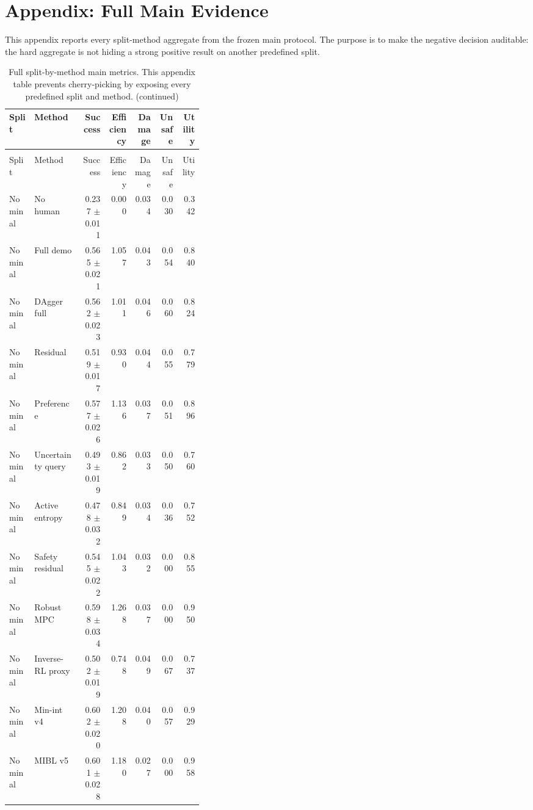 \documentclass{article}
\begin{document}
\section{Appendix: Full Main Evidence}
This appendix reports every split-method aggregate from the frozen main protocol. The purpose is to make the negative decision auditable: the hard aggregate is not hiding a strong positive result on another predefined split.
\begin{center}
\tiny
\begin{longtable}{p{0.13\linewidth}p{0.24\linewidth}rrrrr}
\caption{Full split-by-method main metrics. This appendix table prevents cherry-picking by exposing every predefined split and method.}\label{tab:full-main}\\
\toprule
Split & Method & Success & Efficiency & Damage & Unsafe & Utility\\
\midrule
\endfirsthead
\caption[]{Full split-by-method main metrics. This appendix table prevents cherry-picking by exposing every predefined split and method. (continued)}\\
\toprule
Split & Method & Success & Efficiency & Damage & Unsafe & Utility\\
\midrule
\endhead
Nominal & No human & 0.237 $\pm$ 0.011 & 0.000 & 0.034 & 0.030 & 0.342\\
Nominal & Full demo & 0.565 $\pm$ 0.021 & 1.057 & 0.043 & 0.054 & 0.840\\
Nominal & DAgger full & 0.562 $\pm$ 0.023 & 1.011 & 0.046 & 0.060 & 0.824\\
Nominal & Residual & 0.519 $\pm$ 0.017 & 0.930 & 0.044 & 0.055 & 0.779\\
Nominal & Preference & 0.577 $\pm$ 0.026 & 1.136 & 0.037 & 0.051 & 0.896\\
Nominal & Uncertainty query & 0.493 $\pm$ 0.019 & 0.862 & 0.033 & 0.050 & 0.760\\
Nominal & Active entropy & 0.478 $\pm$ 0.032 & 0.849 & 0.034 & 0.036 & 0.752\\
Nominal & Safety residual & 0.545 $\pm$ 0.022 & 1.043 & 0.032 & 0.000 & 0.855\\
Nominal & Robust MPC & 0.598 $\pm$ 0.034 & 1.268 & 0.037 & 0.000 & 0.950\\
Nominal & Inverse-RL proxy & 0.502 $\pm$ 0.019 & 0.748 & 0.049 & 0.067 & 0.737\\
Nominal & Min-int v4 & 0.602 $\pm$ 0.020 & 1.208 & 0.040 & 0.057 & 0.929\\
Nominal & MIBL v5 & 0.601 $\pm$ 0.028 & 1.180 & 0.027 & 0.000 & 0.958\\

\end{longtable}
\end{center}
\end{document}
